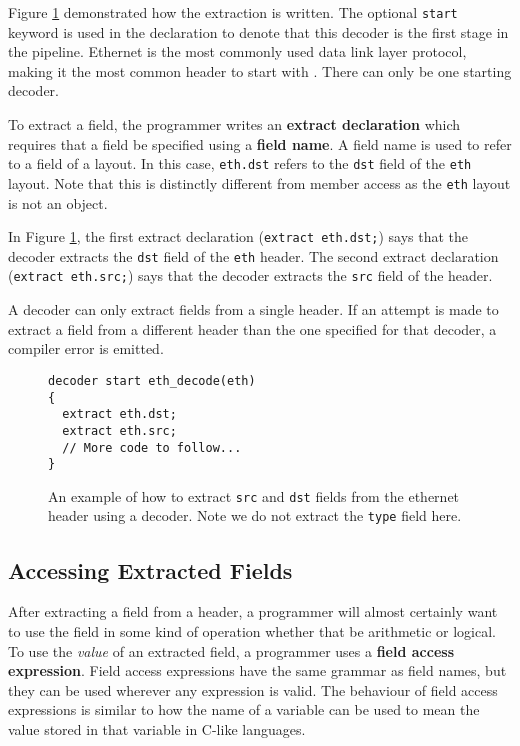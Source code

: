 Figure \ref{fg:extract_ex} demonstrated how the extraction is written. The optional \texttt{start} keyword is used in the declaration to denote that this decoder is the first stage in the pipeline. Ethernet is the most commonly used data link layer protocol, making it the most common header to start with \cite{something}. There can only be one starting decoder. 

To extract a field, the programmer writes an \textbf{extract declaration} which requires that a field be specified using a \textbf{field name}. A field name is used to refer to a field of a layout. In this case, \texttt{eth.dst} refers to the \texttt{dst} field of the \texttt{eth} layout.  Note that this is distinctly different from member access as the \texttt{eth} layout is not an object. 

In Figure \ref{fg:extract_ex}, the first extract declaration (\texttt{extract eth.dst;}) says that the decoder extracts the \texttt{dst} field of the \texttt{eth} header. The second extract declaration (\texttt{extract eth.src;}) says that the decoder extracts the \texttt{src} field of the  header. 

A decoder can only extract fields from a single header. If an attempt is made to extract a field from a different header than the one specified for that decoder, a compiler error is emitted.

\begin{figure}
\begin{lstlisting}
decoder start eth_decode(eth)
{
  extract eth.dst;
  extract eth.src;
  // More code to follow...
}
\end{lstlisting}
\caption{An example of how to extract \texttt{src} and \texttt{dst} fields from the ethernet header using a decoder. Note we do not extract the \texttt{type} field here.}
\label{fg:extract_ex}
\end{figure}

\subsection{Accessing Extracted Fields} \label{decoder_access_tut}

After extracting a field from a header, a programmer will almost certainly want to use the field in some kind of operation whether that be arithmetic or logical. To use the \textit{value} of an extracted field, a programmer uses a \textbf{field access expression}. Field access expressions have the same grammar as field names, but they can be used wherever any expression is valid. The behaviour of field access expressions is similar to how the name of a variable can be used to mean the value stored in that variable in C-like languages.

